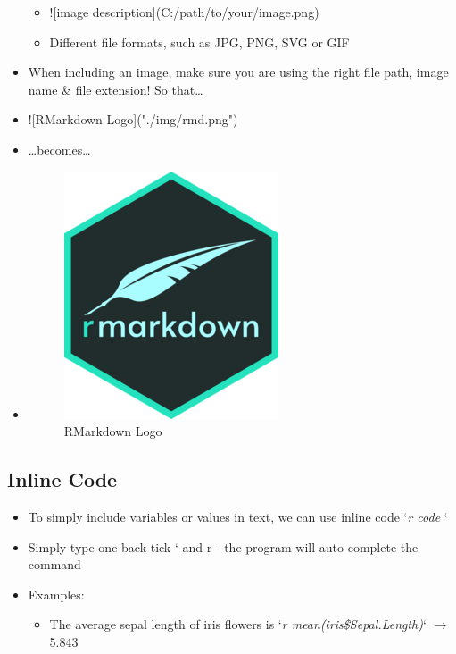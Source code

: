 \documentclass[
]{book}
\newenvironment{Shaded}{\begin{snugshade}}{\end{snugshade}}
\newcommand{\AlertTok}[1]{\textcolor[rgb]{0.94,0.16,0.16}{#1}}
\providecommand{\tightlist}{%
  \setlength{\itemsep}{0pt}\setlength{\parskip}{0pt}}
\begin{document}
\begin{itemize}
  \begin{itemize}
  \item
\begin{Shaded}
\begin{Highlighting}[]
\AlertTok{![image description](C:/path/to/your/image.png)}
\end{Highlighting}
\end{Shaded}
  \item
    Different file formats, such as JPG, PNG, SVG or GIF
  \end{itemize}
\item
  When including an image, make sure you are using the right file path, image name \& file extension! So that\ldots{}
\item
\begin{Shaded}
\begin{Highlighting}[]
\AlertTok{![RMarkdown Logo]("./img/rmd.png")}
\end{Highlighting}
\end{Shaded}
\item
  \ldots becomes\ldots{}
\item
  \begin{figure}
  \centering
  \includegraphics{./img/rmd.png}
  \caption{RMarkdown Logo}
  \end{figure}
\end{itemize}

\subsection{Inline Code}\label{inline-code}

\begin{itemize}
\tightlist
\item
  To simply include variables or values in text, we can use inline code `\emph{r code} `
\item
  Simply type one back tick ` and r - the program will auto complete the command
\item
  Examples:

  \begin{itemize}
  \tightlist
  \item
    The average sepal length of iris flowers is
    `\emph{r mean(iris\$Sepal.Length)}` \(\rightarrow\) 5.843
  \end{itemize}
\end{itemize}
\end{document}
